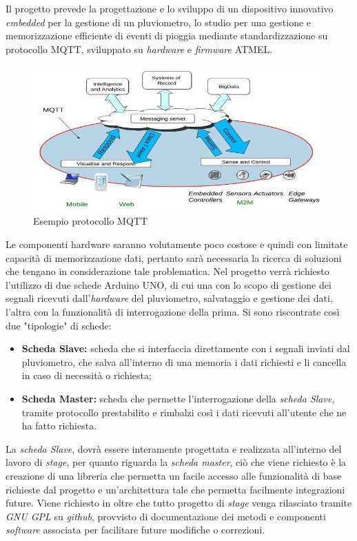 Il progetto prevede la progettazione e lo sviluppo di un dispositivo innovativo \textit{embedded} per la gestione di un pluviometro, lo studio per una gestione e memorizzazione efficiente di eventi di pioggia
mediante standardizzazione su protocollo MQTT, sviluppato su \textit{hardware} e \textit{firmware} ATMEL.

\begin{figure}[htbp]
	\centering
	\includegraphics[scale=1]{./capitoli/capitolo2/img/mqtt}
	\caption{Esempio protocollo MQTT}

\end{figure}

Le componenti hardware saranno volutamente poco costose e quindi con limitate capacità di memorizzazione dati, pertanto sarà necessaria la ricerca di soluzioni che tengano in considerazione tale problematica. Nel progetto verrà richiesto l'utilizzo di due schede Arduino UNO, di cui una con lo scopo di gestione dei segnali ricevuti dall'\textit{hardware} del pluviometro, salvataggio e gestione dei dati, l'altra con la funzionalità di interrogazione della prima. Si sono riscontrate così due "tipologie" di schede:
\begin{itemize}
	\item \textbf{Scheda Slave:} scheda che si interfaccia direttamente con i segnali inviati dal pluviometro, che salva all'interno di una memoria i dati richiesti e li cancella in caso di necessità o richiesta;
	\item \textbf{Scheda Master:} scheda che permette l'interrogazione della \textit{scheda Slave}, tramite protocollo prestabilito e rimbalzi così i dati ricevuti all'utente che ne ha fatto richiesta.

\end{itemize}

La \textit{scheda Slave}, dovrà essere interamente progettata e realizzata all'interno del lavoro di \textit{stage}, per quanto riguarda la \textit{scheda master}, ciò che viene richiesto è la creazione di una libreria che permetta un facile accesso alle funzionalità di base richieste dal progetto e un'architettura tale che permetta facilmente integrazioni future.
Viene richiesto in oltre che tutto  progetto di \textit{stage} venga rilasciato tramite \textit{GNU GPL} su \textit{github}, provvisto di documentazione dei metodi e componenti \textit{software} associata per facilitare future modifiche o correzioni.


